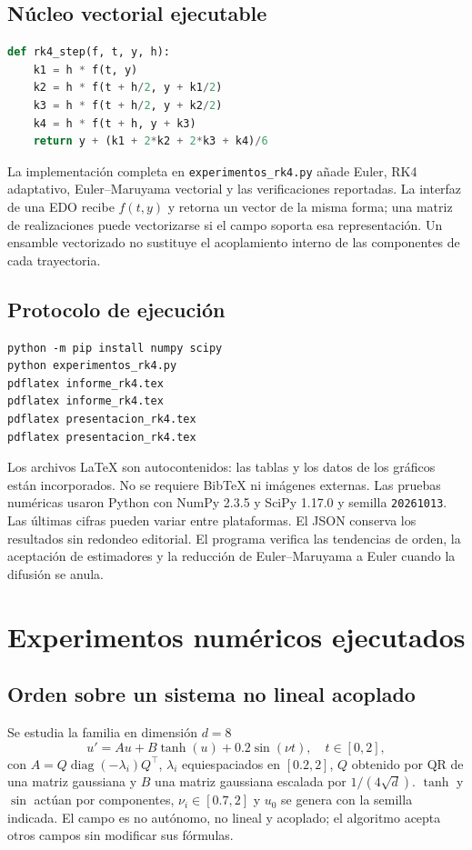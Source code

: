\documentclass[11pt,a4paper]{article}
\theoremstyle{definition}\newtheorem{definition}[theorem]{Definición}
\theoremstyle{remark}\newtheorem{remark}[theorem]{Observación}
\newcommand{\diag}{\operatorname{diag}}\newcommand{\atol}{\mathrm{atol}}
\begin{document}
\subsection{Núcleo vectorial ejecutable}
\begin{lstlisting}[language=Python]
def rk4_step(f, t, y, h):
    k1 = h * f(t, y)
    k2 = h * f(t + h/2, y + k1/2)
    k3 = h * f(t + h/2, y + k2/2)
    k4 = h * f(t + h, y + k3)
    return y + (k1 + 2*k2 + 2*k3 + k4)/6
\end{lstlisting}
La implementación completa en \texttt{experimentos\_rk4.py} añade Euler,
RK4 adaptativo, Euler--Maruyama vectorial y las verificaciones reportadas.
La interfaz de una EDO recibe $f(t,y)$ y retorna un vector de la misma
forma; una matriz de realizaciones puede vectorizarse si el campo soporta
esa representación. Un ensamble vectorizado no sustituye el acoplamiento
interno de las componentes de cada trayectoria.

\subsection{Protocolo de ejecución}
\begin{lstlisting}
python -m pip install numpy scipy
python experimentos_rk4.py
pdflatex informe_rk4.tex
pdflatex informe_rk4.tex
pdflatex presentacion_rk4.tex
pdflatex presentacion_rk4.tex
\end{lstlisting}
Los archivos LaTeX son autocontenidos: las tablas y los datos de los
gráficos están incorporados. No se requiere BibTeX ni imágenes externas.
Las pruebas numéricas usaron Python con NumPy 2.3.5 y SciPy 1.17.0 y semilla
\texttt{20261013}. Las últimas cifras pueden variar entre plataformas.
El JSON conserva los resultados sin redondeo editorial. El programa verifica
las tendencias de orden, la aceptación de estimadores y la reducción de
Euler--Maruyama a Euler cuando la difusión se anula.

\clearpage
\section{Experimentos numéricos ejecutados}
\subsection{Orden sobre un sistema no lineal acoplado}
Se estudia la familia en dimensión $d=8$
\[
 u'=Au+B\tanh(u)+0.2\sin(\nu t),\quad t\in[0,2],
\]
con $A=Q\diag(-\lambda_i)Q^\top$, $\lambda_i$ equiespaciados en $[0.2,2]$,
$Q$ obtenido por QR de una matriz gaussiana y $B$ una matriz gaussiana
escalada por $1/(4\sqrt d)$. $\tanh$ y $\sin$ actúan por componentes,
$\nu_i\in[0.7,2]$ y $u_0$ se genera con la semilla indicada. El campo es
no autónomo, no lineal y acoplado; el algoritmo acepta otros campos sin
modificar sus fórmulas.
\end{document}
